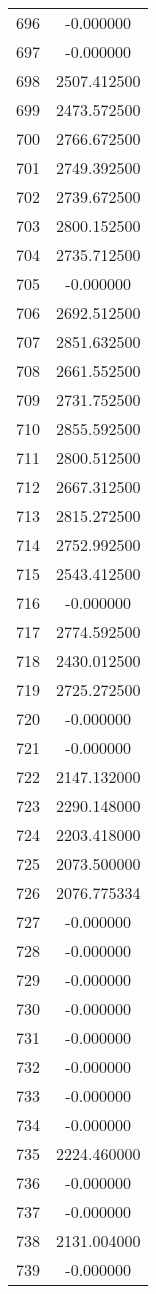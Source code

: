 \documentclass[12pt]{article}
\begin{document}
\begin{longtable}{@{}cc@{}}
696 & -0.000000 \\
697 & -0.000000 \\
698 & 2507.412500 \\
699 & 2473.572500 \\
700 & 2766.672500 \\
701 & 2749.392500 \\
702 & 2739.672500 \\
703 & 2800.152500 \\
704 & 2735.712500 \\
705 & -0.000000 \\
706 & 2692.512500 \\
707 & 2851.632500 \\
708 & 2661.552500 \\
709 & 2731.752500 \\
710 & 2855.592500 \\
711 & 2800.512500 \\
712 & 2667.312500 \\
713 & 2815.272500 \\
714 & 2752.992500 \\
715 & 2543.412500 \\
716 & -0.000000 \\
717 & 2774.592500 \\
718 & 2430.012500 \\
719 & 2725.272500 \\
720 & -0.000000 \\
721 & -0.000000 \\
722 & 2147.132000 \\
723 & 2290.148000 \\
724 & 2203.418000 \\
725 & 2073.500000 \\
726 & 2076.775334 \\
727 & -0.000000 \\
728 & -0.000000 \\
729 & -0.000000 \\
730 & -0.000000 \\
731 & -0.000000 \\
732 & -0.000000 \\
733 & -0.000000 \\
734 & -0.000000 \\
735 & 2224.460000 \\
736 & -0.000000 \\
737 & -0.000000 \\
738 & 2131.004000 \\
739 & -0.000000 \\

\end{longtable}
\end{document}
